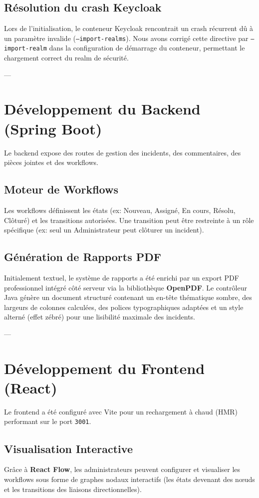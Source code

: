 \documentclass[12pt]{article}
\begin{document}
\subsection{Résolution du crash Keycloak}
Lors de l'initialisation, le conteneur Keycloak rencontrait un crash récurrent dû à un paramètre invalide (\texttt{--import-realms}). Nous avons corrigé cette directive par \texttt{--import-realm} dans la configuration de démarrage du conteneur, permettant le chargement correct du realm de sécurité.

---

\section{Développement du Backend (Spring Boot)}
Le backend expose des routes de gestion des incidents, des commentaires, des pièces jointes et des workflows.

\subsection{Moteur de Workflows}
Les workflows définissent les états (ex: Nouveau, Assigné, En cours, Résolu, Clôturé) et les transitions autorisées. Une transition peut être restreinte à un rôle spécifique (ex: seul un Administrateur peut clôturer un incident).

\subsection{Génération de Rapports PDF}
Initialement textuel, le système de rapports a été enrichi par un export PDF professionnel intégré côté serveur via la bibliothèque \textbf{OpenPDF}. Le contrôleur Java génère un document structuré contenant un en-tête thématique sombre, des largeurs de colonnes calculées, des polices typographiques adaptées et un style alterné (effet zébré) pour une lisibilité maximale des incidents.

---

\section{Développement du Frontend (React)}
Le frontend a été configuré avec Vite pour un rechargement à chaud (HMR) performant sur le port \texttt{3001}.

\subsection{Visualisation Interactive}
Grâce à \textbf{React Flow}, les administrateurs peuvent configurer et visualiser les workflows sous forme de graphes nodaux interactifs (les états devenant des nœuds et les transitions des liaisons directionnelles).
\end{document}
